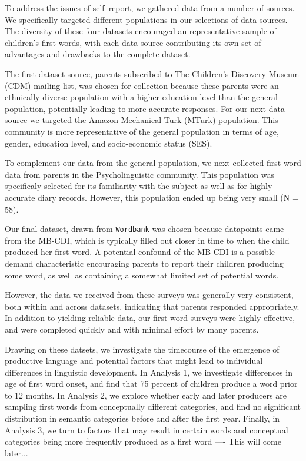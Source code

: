 \documentclass[10pt,letterpaper]{article}
\begin{document}
To address the issues of self--report, we gathered data from a number of sources. We specifically targeted different populations in our selections of data sources. The diversity of these four datasets encouraged an representative sample of children's first words, with each data source contributing its own set of advantages and drawbacks to the complete dataset. 

The first dataset source, parents subscribed to The Children's Discovery Museum (CDM) mailing list, was chosen for collection because these parents were an ethnically diverse population with a higher education level than the general population, potentially leading to more accurate responses. For our next data source we targeted the Amazon Mechanical Turk (MTurk) population. This community is more representative of the general population in terms of age, gender, education level, and socio-economic status (SES). 

To complement our data from the general population, we next collected first word data from parents in the Psycholinguistic community. This population was specificaly selected for its familiarity with the subject as well as for highly accurate diary records. However, this population ended up being very small (N = 58).

Our final dataset, drawn from \href{http://wordbank.stanford.edu}{\tt{Wordbank}} was chosen because datapoints came from the MB-CDI, which is typically filled out closer in time to when the child produced her first word. A potential confound of the MB-CDI is a possible  demand characteristic encouraging parents to report their children producing some word, as well as containing a somewhat limited set of potential words.

However, the data we received from these surveys was generally very consistent, both within and across datasets, indicating that parents responded appropriately. In addition to yielding reliable data, our first word surveys were highly effective, and were completed quickly and with minimal effort by many parents. 

Drawing on these datsets, we investigate the timecourse of the emergence of productive language   and potential factors that might lead to individual differences in linguistic development. In Analysis 1, we investigate differences in age of first word onset, and find that 75 percent of children produce a word prior to 12 months. In Analysis 2, we explore whether early and later producers are sampling first words from conceptually different categories, and find no significant distribution in semantic categories before and after the first year. Finally, in Analysis 3, we turn to factors that may result in certain words and conceptual categories being more frequently produced as a first word ---- This will come later...
\end{document}
